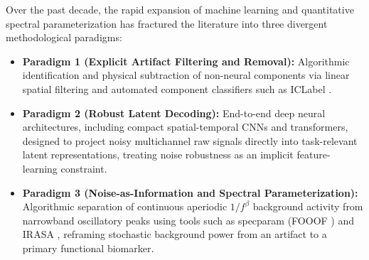 \documentclass[preprint,12pt]{elsarticle}
\begin{document}
Over the past decade, the rapid expansion of machine learning and quantitative spectral parameterization has fractured the literature into three divergent methodological paradigms:
\begin{itemize}
    \item \textbf{Paradigm 1 (Explicit Artifact Filtering and Removal):} Algorithmic identification and physical subtraction of non-neural components via linear spatial filtering and automated component classifiers such as ICLabel \cite{pion2019iclabel}.
    \item \textbf{Paradigm 2 (Robust Latent Decoding):} End-to-end deep neural architectures, including compact spatial-temporal CNNs \cite{lawhern2018eegnet} and transformers, designed to project noisy multichannel raw signals directly into task-relevant latent representations, treating noise robustness as an implicit feature-learning constraint.
    \item \textbf{Paradigm 3 (Noise-as-Information and Spectral Parameterization):} Algorithmic separation of continuous aperiodic $1/f^\beta$ background activity from narrowband oscillatory peaks using tools such as specparam (FOOOF \cite{donoghue2020parameterizing}) and IRASA \cite{wen2016separating, gerster2022separating}, reframing stochastic background power from an artifact to a primary functional biomarker.
\end{itemize}
\end{document}
